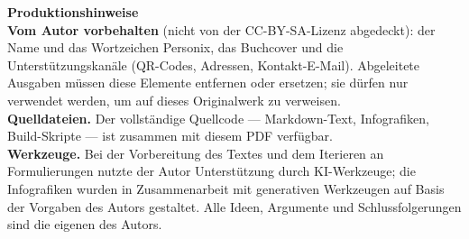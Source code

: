 \clearpage
\thispagestyle{empty}
\begin{flushleft}\small\sffamily
\textbf{Produktionshinweise}\\[1.2em]

\textbf{Vom Autor vorbehalten} (nicht von der CC-BY-SA-Lizenz abgedeckt): der
Name und das Wortzeichen Personix, das Buchcover und die Unterstützungskanäle
(QR-Codes, Adressen, Kontakt-E-Mail). Abgeleitete Ausgaben müssen diese Elemente
entfernen oder ersetzen; sie dürfen nur verwendet werden, um auf dieses
Originalwerk zu verweisen.\\[1.2em]

\textbf{Quelldateien.} Der vollständige Quellcode --- Markdown-Text, Infografiken,
Build-Skripte --- ist zusammen mit diesem PDF verfügbar.\\[1.2em]

\textbf{Werkzeuge.} Bei der Vorbereitung des Textes und dem Iterieren an
Formulierungen nutzte der Autor Unterstützung durch KI-Werkzeuge; die Infografiken
wurden in Zusammenarbeit mit generativen Werkzeugen auf Basis der Vorgaben des
Autors gestaltet. Alle Ideen, Argumente und Schlussfolgerungen sind die eigenen
des Autors.
\end{flushleft}
\clearpage

